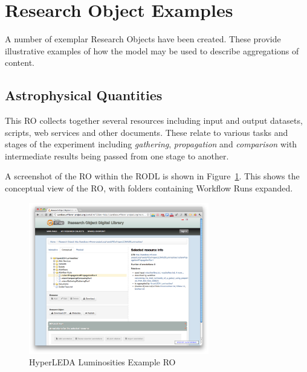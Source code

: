 \newcommand{\picwidth}{0.7\textwidth}

\section{Research Object Examples}
\label{sec:examples}

A number of exemplar Research Objects have been created. These
provide illustrative examples of how the model may be used to describe
aggregations of content. 

\subsection{Astrophysical Quantities}

This RO collects together several resources including input and output
datasets, scripts, web services and other documents. These relate to
various tasks and stages of the experiment including
\emph{gathering}, \emph{propagation} and \emph{comparison} with
intermediate results being passed from one stage to another. 

A screenshot of the RO within the RODL is shown in
Figure~\ref{fig:hyperleda}. This shows the conceptual view of the RO,
with folders containing Workflow Runs expanded.

\begin{figure}[h]
  \centering
  \includegraphics[width=\picwidth]{Figures/HyperLEDA}
  \caption{HyperLEDA Luminosities Example RO}
  \label{fig:hyperleda}
\end{figure}

